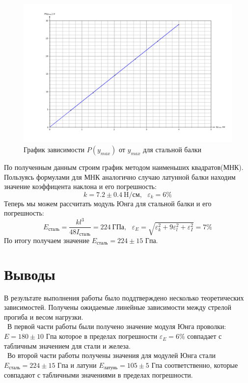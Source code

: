 \documentclass[a4paper,12pt]{article} %
\begin{document}
\begin{itemize}
\begin{figure}[h]
    \begin{center}
    \includegraphics[width=1\textwidth]{pictures/graphic3b.png}
    \caption{График зависимости $P(y_{max})$ от $y_{max}$ для стальной балки}
    \end{center}
\end{figure}

По полученным данным строим график методом наименьших квадратов(МНК).\\
Пользуясь формулами для МНК аналогично случаю латунной балки находим значение коэффицента наклона и его погрешность:
$$k = 7.2 \pm 0.4 \ \text{H}/\text{см}, \ \ \ \varepsilon_{k}=6 \% $$
Теперь мы можем рассчитать модуль Юнга для стальной балки и его погрешность:
$$E_{\text{сталь}} = \frac{k l^3}{48 I_{\text{сталь}}}=224 \ \text{ГПа}, \ \ \ 
\varepsilon_{E}=\sqrt{\varepsilon^2_{k}+9\varepsilon^2_{l}+\varepsilon^2_{I}} = 7\%$$
По итогу получаем значение $E_{\text{сталь}}= 224 \pm 15$ Гпа.

\end{itemize}

\section{Выводы}

В результате выполнения работы было поддтверждено несколько теоретических зависимостей. Получены ожидаемые
линейные зависимости между стрелой прогиба и весом нагрузки.\\
\ В первой части работы были получено значение модуля Юнга проволки:
$E = 180 \pm 10$ Гпа которое в пределах погрешности  $\varepsilon_{E}= 6 \%$ совпадает с табличным значением для стали и железа.\\
\ Во второй части работы получены значения для модулей Юнга стали $E_{\text{сталь}}= 224 \pm 15$ Гпа и латуни $E_{\text{латунь}}= 105 \pm 5$ Гпа соответственно, 
которые совпадают с табличными значениями в пределах погрешности.
\end{document}
